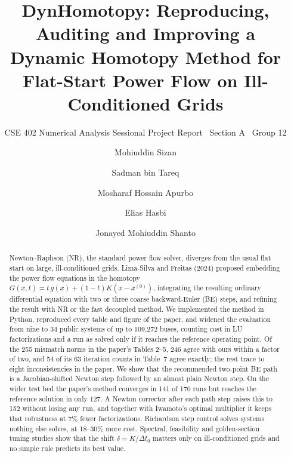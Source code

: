 \documentclass[sigconf,nonacm]{acmart}
\newcommand{\xo}{x^{(0)}}
\begin{document}
\title{DynHomotopy: Reproducing, Auditing and Improving a Dynamic Homotopy Method
for Flat-Start Power Flow on Ill-Conditioned Grids}
\subtitle{CSE 402 Numerical Analysis Sessional Project Report \textbullet\ Section A \textbullet\ Group 12}

\author{Mohiuddin Sizan}

\author{Sadman bin Tareq}

\author{Mosharaf Hossain Apurbo}

\author{Elias Hasbi}

\author{Jonayed Mohiuddin Shanto}

\renewcommand{\shortauthors}{Section A, Group 12}

\begin{abstract}
Newton--Raphson (NR), the standard power flow solver, diverges from the usual flat start on large,
ill-conditioned grids. Lima-Silva and Freitas (2024) proposed embedding the power flow equations in the
homotopy $G(x,t)=t\,g(x)+(1-t)K(x-\xo)$, integrating the resulting ordinary differential equation with
two or three coarse backward-Euler (BE) steps, and refining the result with NR or the fast decoupled
method. We implemented the method in Python, reproduced every table and figure of the paper, and widened
the evaluation from nine to 34 public systems of up to 109{,}272 buses, counting cost in LU
factorizations and a run as solved only if it reaches the reference operating point. Of the 255 mismatch
norms in the paper's Tables 2--5, 246 agree with ours within a factor of two, and 54 of its 63 iteration
counts in Table~7 agree exactly; the rest trace to eight inconsistencies in the paper.
We show that the recommended two-point BE path is a Jacobian-shifted Newton step followed by an almost
plain Newton step. On the wider test bed the paper's method converges in 141 of 170 runs but reaches
the reference solution in only 127. A Newton corrector after each path step raises this to 152 without
losing any run, and together with Iwamoto's optimal multiplier it keeps that robustness at 7\% fewer
factorizations. Richardson step control solves systems nothing else solves, at 18--30\% more cost.
Spectral, feasibility and golden-section tuning studies show that the shift $\delta=K/\Delta t_0$ matters
only on ill-conditioned grids and no simple rule predicts its best value.
\end{abstract}
\end{document}
